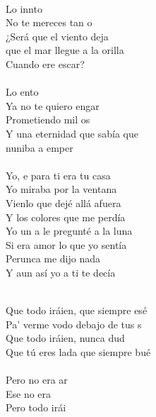 \begin{cancion}%
	    \chord{}{-}{ }  \\
	Lo innto\\
	No te mereces tan o\\
	¿Será que el viento deja \\
que el mar llegue a la orilla\\
	Cuando ere escar?\\
\jump\\
	Lo ento\\
	Ya no te quiero engar\\
	Prometiendo mil os\\
Y una eternidad que sabía que \\
	nuniba a emper\\
\jump\\
	Yo, e para ti era tu casa\\
Yo miraba por la ventana\\
	Vienlo que dejé allá afuera\\
Y los colores que me perdía\\
	Yo un a le pregunté a la luna\\
Si era amor lo que yo sentía\\
	Perunca me dijo nada\\
Y aun así yo a ti te decía\\\jump\\
	\begin{chorus}%
	Que todo iráien, que siempre esé\\
	Pa' verme vodo debajo de tus s\\
	Que todo iráien, nunca dud \\
	Que tú eres lada que siempre bué\\
\jump\\
	Pero no era ar\\
	Ese no era \\
	Pero todo irái \\

\end{chorus}
\end{cancion}

